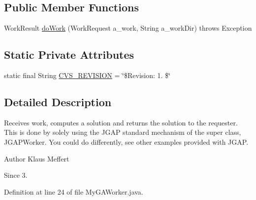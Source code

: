 \subsection*{Public Member Functions}
\begin{DoxyCompactItemize}
\item 
Work\-Result \hyperlink{classexamples_1_1grid_1_1evolution_distributed_1_1_my_g_a_worker_a8f7f0cb3dff2f07cd6c656c2402bd35d}{do\-Work} (Work\-Request a\-\_\-work, String a\-\_\-work\-Dir)  throws Exception 
\end{DoxyCompactItemize}
\subsection*{Static Private Attributes}
\begin{DoxyCompactItemize}
\item 
static final String \hyperlink{classexamples_1_1grid_1_1evolution_distributed_1_1_my_g_a_worker_af519c7a4d616360bbd1aa7c565b81066}{C\-V\-S\-\_\-\-R\-E\-V\-I\-S\-I\-O\-N} = \char`\"{}\$Revision\-: 1. \$\char`\"{}
\end{DoxyCompactItemize}


\subsection{Detailed Description}
Receives work, computes a solution and returns the solution to the requester. This is done by solely using the J\-G\-A\-P standard mechanism of the super class, J\-G\-A\-P\-Worker. You could do differently, see other examples provided with J\-G\-A\-P.

\begin{DoxyAuthor}{Author}
Klaus Meffert 
\end{DoxyAuthor}
\begin{DoxySince}{Since}
3. 
\end{DoxySince}


Definition at line 24 of file My\-G\-A\-Worker.\-java.



